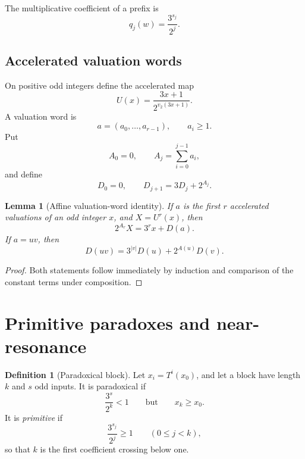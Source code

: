 \documentclass[11pt,reqno]{amsart}
\numberwithin{equation}{section}
\newtheorem{lemma}[theorem]{Lemma}
\theoremstyle{definition}
\newtheorem{definition}[theorem]{Definition}
\theoremstyle{remark}
\newcommand{\vtwo}{v_2}
\begin{document}
The multiplicative coefficient of a prefix is
\begin{equation}\label{eq:q-shortcut}
q_j(w)=\frac{3^{s_j}}{2^j}.
\end{equation}

\subsection{Accelerated valuation words}

On positive odd integers define the accelerated map
\begin{equation}\label{eq:U-map}
U(x)=\frac{3x+1}{2^{\vtwo(3x+1)}}.
\end{equation}
A valuation word is
\[
a=(a_0,\ldots,a_{r-1}),
\qquad a_i\ge1.
\]
Put
\[
A_0=0,
\qquad
A_j=\sum_{i=0}^{j-1}a_i,
\]
and define
\begin{equation}\label{eq:valuation-carry}
D_0=0,
\qquad
D_{j+1}=3D_j+2^{A_j}.
\end{equation}

\begin{lemma}[Affine valuation-word identity]\label{lem:valuation-affine}
If $a$ is the first $r$ accelerated valuations of an odd integer $x$, and
$X=U^r(x)$, then
\begin{equation}\label{eq:valuation-affine}
2^{A_r}X=3^rx+D(a).
\end{equation}
If $a=uv$, then
\begin{equation}\label{eq:valuation-concat}
D(uv)=3^{|v|}D(u)+2^{A(u)}D(v).
\end{equation}
\end{lemma}

\begin{proof}
Both statements follow immediately by induction and comparison of the
constant terms under composition.
\end{proof}

\section{Primitive paradoxes and near-resonance}\label{sec:paradox}

\begin{definition}[Paradoxical block]
Let $x_i=T^i(x_0)$, and let a block have length $k$ and $s$ odd inputs.  It
is paradoxical if
\[
\frac{3^s}{2^k}<1
\qquad\text{but}\qquad
x_k\ge x_0.
\]
It is \emph{primitive} if
\begin{equation}\label{eq:primitive-barrier}
\frac{3^{s_j}}{2^j}\ge1
\qquad(0\le j<k),
\end{equation}
so that $k$ is the first coefficient crossing below one.
\end{definition}
\end{document}
